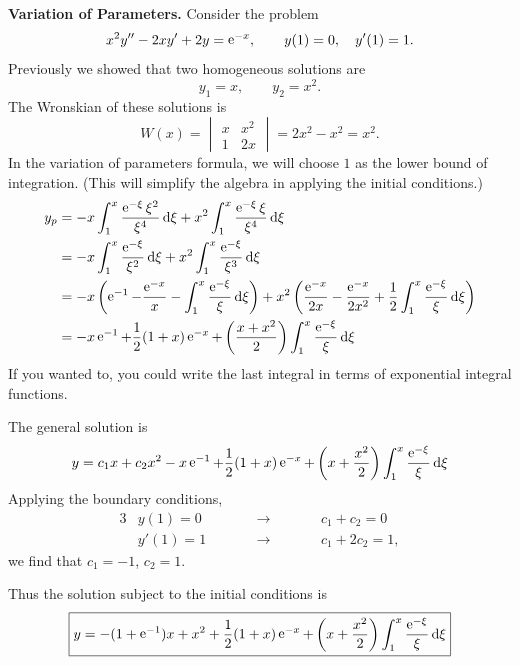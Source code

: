{%
\begin{Solution}
  \label{solution x2y-2xy+2y=e-x}
  \textbf{Variation of Parameters.}
  Consider the problem
  \[ 
  x^2 y'' - 2 x y' + 2 y = \mathop{\mathrm{e}}\nolimits^{-x}, \qquad y(1) = 0, \quad y'(1) = 1. 
  \]
  Previously we showed that two homogeneous solutions are
  \[ 
  y_1 = x, \qquad y_2 = x^2. 
  \]
  The Wronskian of these solutions is
  \[ 
  W(x) =
  \begin{vmatrix}
    x       &       x^2     \\
    1       &       2x
  \end{vmatrix}
  = 2x^2 - x^2 = x^2.
  \]
  In the variation of parameters formula, we will choose $1$ as the lower
  bound of integration.  (This will simplify the algebra in applying the
  initial conditions.)
  \begin{align*}
    y_p     &= -x \int_1^x \frac{\mathop{\mathrm{e}}\nolimits^{-\xi} \xi^2}{\xi^4}\,\mathrm{d} \xi + x^2 \int_1^x
    \frac{\mathop{\mathrm{e}}\nolimits^{-\xi} \xi}{\xi^4}\,\mathrm{d} \xi \\
    &= -x \int_1^x \frac{\mathop{\mathrm{e}}\nolimits^{-\xi}}{\xi^2} \,\mathrm{d} \xi 
    + x^2 \int_1^x \frac{\mathop{\mathrm{e}}\nolimits^{-\xi}}{\xi^3} \,\mathrm{d} \xi \\
    &= -x \left(\mathop{\mathrm{e}}\nolimits^{-1}-\frac{\mathop{\mathrm{e}}\nolimits^{-x}}{x} 
      - \int_1^x \frac{\mathop{\mathrm{e}}\nolimits^{-\xi}}{\xi} \,\mathrm{d} \xi \right)
    + x^2 \left( \frac{\mathop{\mathrm{e}}\nolimits^{-x}}{2x} - \frac{\mathop{\mathrm{e}}\nolimits^{-x}}{2x^2}
      + \frac{1}{2}\int_1^x \frac{\mathop{\mathrm{e}}\nolimits^{-\xi}}{\xi} \,\mathrm{d} \xi \right)\\
    &= -x \mathop{\mathrm{e}}\nolimits^{-1} + \frac{1}{2} (1+x) \mathop{\mathrm{e}}\nolimits^{-x} 
    + \left(\frac{x+x^2}{2}\right) 
    \int_1^x \frac{\mathop{\mathrm{e}}\nolimits^{-\xi}}{\xi} \,\mathrm{d} \xi
  \end{align*}
  If you wanted to, you could write the last integral in terms of exponential
  integral functions.

  The general solution is
  \[ 
  y = c_1 x + c_2 x^2  -x \mathop{\mathrm{e}}\nolimits^{-1} + \frac{1}{2} (1+x) \mathop{\mathrm{e}}\nolimits^{-x} 
  + \left(x+\frac{x^2}{2}\right) \int_1^x \frac{\mathop{\mathrm{e}}\nolimits^{-\xi}}{\xi} \,\mathrm{d} \xi
  \]
  Applying the boundary conditions,
  \begin{alignat*}{3}
    &y(1) = 0 &\qquad &\to &\qquad &c_1 + c_2 = 0 \\
    &y'(1) = 1 &\qquad &\to &\qquad &c_1 + 2 c_2 = 1,
  \end{alignat*}
  we find that $c_1 = -1$, $c_2 = 1$.

  Thus the solution subject to the initial conditions is
  \[ 
  \boxed{ 
    y = -(1+\mathop{\mathrm{e}}\nolimits^{-1})x + x^2 + \frac{1}{2} (1+x) \mathop{\mathrm{e}}\nolimits^{-x} 
    + \left(x+\frac{x^2}{2}\right) \int_1^x \frac{\mathop{\mathrm{e}}\nolimits^{-\xi}}{\xi} \,\mathrm{d} \xi
    }
  \]


\end{Solution}}
